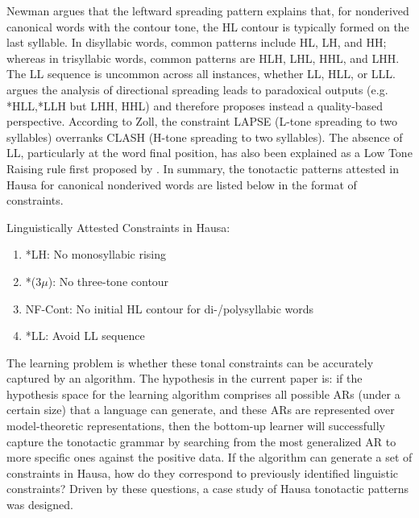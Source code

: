 \documentclass[11pt,letterpaper]{article}
\begin{document}
Newman argues that the leftward spreading pattern explains that, for nonderived canonical words with the contour tone, the HL contour is typically formed on the last syllable. In disyllabic words, common patterns include HL, LH, and HH; whereas in trisyllabic words, common patterns are HLH, LHL, HHL, and LHH. The LL sequence is uncommon across all instances, whether LL, HLL, or LLL. \cite{zoll2003optimal} argues the analysis of directional spreading leads to paradoxical outputs (e.g. *HLL,*LLH but LHH, HHL) and therefore proposes instead a quality-based perspective. According to Zoll, the constraint LAPSE (L-tone spreading to two syllables) overranks CLASH (H-tone spreading to two syllables). The absence of LL, particularly at the word final position, has also been explained as a Low Tone Raising rule  first proposed by \cite{Leben}. In summary, the tonotactic patterns attested in Hausa for canonical nonderived words are listed below in the format of constraints.

\ea Linguistically Attested Constraints in Hausa:
\begin{enumerate}
	\item *LH: No monosyllabic rising
	\item *(3$\mu$): No three-tone contour
	\item NF-Cont: No initial HL contour for di-/polysyllabic words
	\item *LL: Avoid LL sequence
\end{enumerate}
\z 

The learning problem is whether these tonal constraints can be accurately captured by an algorithm. The 
hypothesis in the current paper is: if the hypothesis space for the learning algorithm comprises all possible ARs (under a certain size) that a language can generate, and these ARs are represented over model-theoretic representations, then the bottom-up learner will successfully capture the tonotactic grammar by searching from the most generalized AR to more specific ones against the positive data. If the algorithm can generate a set of constraints in Hausa, how do they correspond to previously identified linguistic constraints? Driven by these questions, a case study of Hausa tonotactic patterns was designed.
\end{document}
